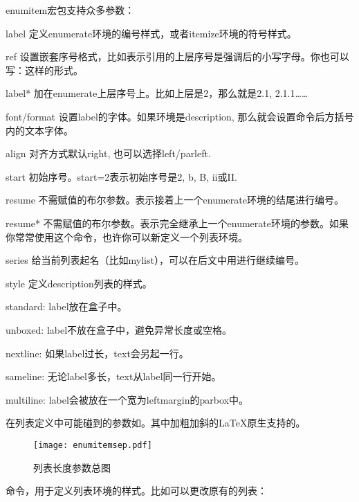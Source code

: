 enumitem宏包支持众多参数：
\begin{para}
\item[label] 定义enumerate环境的编号样式，或者itemize环境的符号样式。
\item[ref] 设置嵌套序号格式，比如\latexline{[ref=\\emph{\\alph*}]}表示引用的上层序号是强调后的小写字母。你也可以写：\latexline{[label=\alph{enumi}. \roman*]}这样的形式。
\item[label*] 加在enumerate上层序号上。比如上层是2，那么就是2.1, 2.1.1……
\item[font/format] 设置label的字体。如果环境是description, 那么就会设置\latexline{\\item}命令后方括号内的文本字体。
\item[align] 对齐方式默认right, 也可以选择left/parleft. 
\item[start] 初始序号。start=2表示初始序号是2, b, B, ii或II.
\item[resume] 不需赋值的布尔参数。表示接着上一个enumerate环境的结尾进行编号。
\item[resume*] 不需赋值的布尔参数。表示完全继承上一个enumerate环境的参数。如果你常常使用这个命令，也许你可以新定义一个列表环境。
\item[series] 给当前列表起名（比如mylist），可以在后文中用进行继续编号。
\item[style] 定义description列表的样式。
\begin{para}
\item[standard:] label放在盒子中。
\item[unboxed:] label不放在盒子中，避免异常长度或空格。
\item[nextline:] 如果label过长，text会另起一行。
\item[sameline:] 无论label多长，text从label同一行开始。
\item[multiline:] label会被放在一个宽为leftmargin的parbox中。
\end{para}
\end{para}

在列表定义中可能碰到的参数如。其中加粗加斜的\LaTeX 原生支持的。
\begin{figure}[!hbt]
\texttt{[image: enumitemsep.pdf]}
\caption{列表长度参数总图}
\label{fig:enumitemsep}
\end{figure}

命令\latexline{\\setlist}，用于定义列表环境的样式。比如可以更改原有的列表：
\begin{latex}{}
\end{latex}

